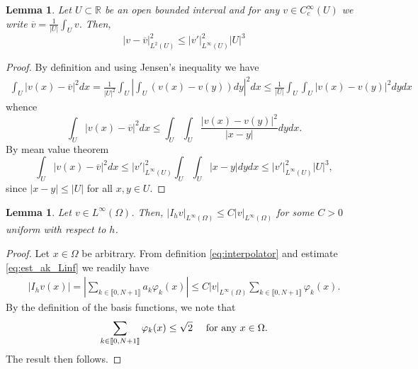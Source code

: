 \documentclass[10 pt]{article}
\newcommand\inter[1]{\llbracket #1\rrbracket}
\newtheorem{lemma}[theorem]{Lemma}
\numberwithin{equation}{section}
\def\R{\mathbb{R}}
\begin{document}
\begin{lemma}\label{lem:poincare_type}
Let $U\subset \R$ be an open bounded interval and for any $v\in C_c^\infty(U)$ we write $\overline v=\frac{1}{|U|}\int_{U}v$. Then,
%
\begin{equation*}
    |v-\overline{v}|_{L^2(U)}^2\leq |v'|^2_{L^\infty(U)}|U|^3
\end{equation*}
%
\end{lemma}
%
\begin{proof}
By definition and using Jensen's inequality we have
%
\begin{align*}
    \int_{U}|v(x)-\overline{v}|^2dx=\frac{1}{|U|^2}\int_{U}\left|\int_{U}(v(x)-v(y))dy\right|^2dx \leq \frac{1}{|U|}\int_{U}\int_{U}|v(x)-v(y)|^2dy dx
\end{align*}
%
whence
%
\begin{equation*}
    \int_{U}|v(x)-\overline{v}|^2dx \leq \int_{U}\int_{U}\frac{|v(x)-v(y)|^2}{|x-y|}dy dx.
\end{equation*}
%
By mean value theorem
%
\begin{equation*}
    \int_{U}|v(x)-\overline{v}|^2dx 
    \leq |v'|^2_{L^\infty(U)}\int_{U}\int_{U}|x-y|dy dx
    \leq |v'|^2_{L^\infty(U)}|U|^3,
\end{equation*}
%
since $|x-y|\leq |U|$ for all $x,y\in U$.
\end{proof}

\begin{lemma}\label{lem:inter_l_infty}
    Let $v\in L^\infty(\Omega)$. Then, $|I_h v|_{L^\infty(\Omega)}\leq C|v|_{L^\infty(\Omega)}$ for some $C>0$ uniform with respect to $h$.
\end{lemma}
%
\begin{proof}
Let $x\in \Omega$ be arbitrary. From definition \eqref{eq:interpolator} and estimate \eqref{eq:est_ak_Linf} we readily have
%
\begin{align*}
    |I_h v(x)|=\left|\sum_{k\in\inter{0,N+1}}a_k \varphi_k(x)\right| \leq C|v|_{L^\infty(\Omega)}\sum_{k\in\inter{0,N+1}}\varphi_k(x).
\end{align*}
%
By the definition of the basis functions, we note that 
%
\begin{equation*}
    \sum_{k\in\inter{0,N+1}}\varphi_k(x)\leq \sqrt{2} \quad \textnormal{ for any $x\in\Omega$}.
\end{equation*}
The result then follows. 
\end{proof}
\end{document}
